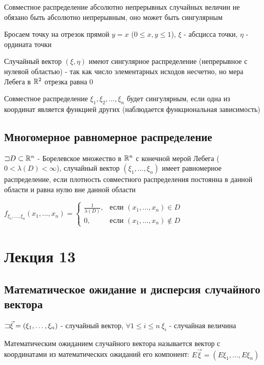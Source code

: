 \documentclass[12pt]{article}
\begin{document}
    \Nota Совместное распределение абсолютно непрерывных случайных величин не обязано быть абсолютно непрерывным, оно может быть сингулярным

    \Exs Бросаем точку на отрезок прямой $y = x$ ($0 \leq x, y \leq 1$), $\xi$ - абсцисса точки, $\eta$ - ордината точки

    Случайный вектор $(\xi, \eta)$ имеют сингулярное распределение (непрерывное с нулевой областью) - 
    так как число элементарных исходов несчетно, но мера Лебега в $\mathbb{R}^2$ отрезка равна 0

    \Nota Совместное распределение $\xi_1, \xi_2, \dots, \xi_n$ будет сингулярным, если одна из координат является функцией других (наблюдается функциональная зависимость)

    \subsection{Многомерное равномерное распределение}

    \Def $\mathord{\sqsupset} D \subset \mathbb{R}^n$ - Борелевское множество в $\mathbb{R}^n$ с конечной мерой Лебега ($0 < \lambda(D) < \infty$),
    случайный вектор $(\xi_1, \dots, \xi_n)$ имеет равномерное распределение, если плотность совместного распределения 
    постоянна в данной области и равна нулю вне данной области

    $f_{\xi_1, \dots, \xi_n}(x_1, \dots, x_n) = \begin{cases}\frac{1}{\lambda(D)}, & \text{если } (x_1, \dots, x_n) \in D \\ 0, & \text{если } (x_1, \dots, x_n) \not\in D\end{cases}$


    \section{Лекция 13}

    \subsection{Математическое ожидание и дисперсия случайного вектора}
    
    $\mathord{\sqsupset} \vec{\xi} = (\xi_1, \dots, \xi_n)$ - случайный вектор, 
    $\forall 1 \leq i \leq n \ \xi_i$ - случайная величина

    \Def Математическим ожиданием случайного вектора называется вектор с координатами 
    из математических ожиданий его компонент: $E\vec{\xi} = (E\xi_1, \dots, E\xi_n)$
\end{document}
